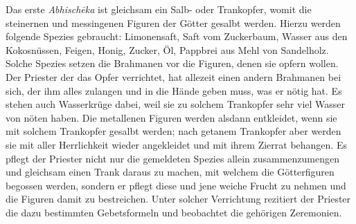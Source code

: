 \documentclass{article}
\begin{document}
Das erste \emph{Abhisch\={e}ka} ist gleichsam ein Salb- oder Trankopfer, womit die steinernen und messingenen Figuren der Götter gesalbt werden. Hierzu werden folgende Spezies gebraucht: Limonensaft, Saft vom Zuckerbaum, Wasser aus den Kokosnüssen, Feigen, Honig, Zucker, Öl, Pappbrei aus Mehl von Sandelholz. Solche Spezies setzen die Brahmanen vor die Figuren, denen sie opfern wollen. Der Priester der das Opfer verrichtet, hat allezeit einen andern Brahmanen bei sich, der ihm alles zulangen und in die Hände geben muss, was er nötig hat. Es stehen auch Wasserkrüge dabei, weil sie zu solchem Trankopfer sehr viel Wasser von nöten haben. Die metallenen Figuren werden alsdann entkleidet, wenn sie mit solchem Trankopfer gesalbt werden; nach getanem Trankopfer aber werden sie mit aller Herrlichkeit wieder angekleidet und mit ihrem Zierrat behangen. Es pflegt der Priester nicht nur die gemeldeten Spezies allein zusammenzumengen und gleichsam einen Trank daraus zu machen, mit welchem die Götterfiguren begossen werden, sondern er pflegt diese und jene weiche Frucht zu nehmen und die Figuren damit zu bestreichen. Unter solcher Verrichtung rezitiert der Priester die dazu bestimmten Gebetsformeln und beobachtet die gehörigen Zeremonien.
\end{document}
